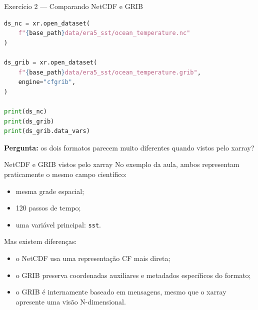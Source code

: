 \documentclass[aspectratio=169]{beamer}
\begin{document}
\begin{frame}[fragile]{Exercício 2 --- Comparando NetCDF e GRIB}
\begin{lstlisting}[language=Python]
ds_nc = xr.open_dataset(
    f"{base_path}data/era5_sst/ocean_temperature.nc"
)

ds_grib = xr.open_dataset(
    f"{base_path}data/era5_sst/ocean_temperature.grib",
    engine="cfgrib",
)

print(ds_nc)
print(ds_grib)
print(ds_grib.data_vars)
\end{lstlisting}

\vspace{0.2cm}

\textbf{Pergunta:} os dois formatos parecem muito diferentes quando vistos pelo xarray?
\end{frame}

\begin{frame}{NetCDF e GRIB vistos pelo xarray}
No exemplo da aula, ambos representam praticamente o mesmo campo científico:

\begin{itemize}
  \item mesma grade espacial;
  \item 120 passos de tempo;
  \item uma variável principal: \texttt{sst}.
\end{itemize}

\vspace{0.3cm}

Mas existem diferenças:

\begin{itemize}
  \item o NetCDF usa uma representação CF mais direta;
  \item o GRIB preserva coordenadas auxiliares e metadados específicos do formato;
  \item o GRIB é internamente baseado em mensagens, mesmo que o xarray apresente uma visão N-dimensional.
\end{itemize}
\end{frame}
\end{document}
